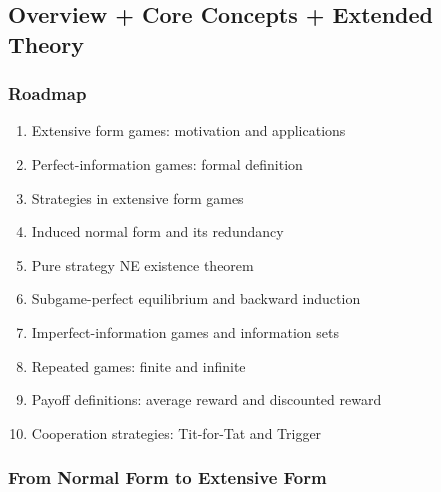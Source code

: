 \separator

\subsection{Overview + Core Concepts + Extended Theory}

\subsubsection*{Roadmap}
\begin{enumerate}
  \item Extensive form games: motivation and applications
  \item Perfect-information games: formal definition
  \item Strategies in extensive form games
  \item Induced normal form and its redundancy
  \item Pure strategy NE existence theorem
  \item Subgame-perfect equilibrium and backward induction
  \item Imperfect-information games and information sets
  \item Repeated games: finite and infinite
  \item Payoff definitions: average reward and discounted reward
  \item Cooperation strategies: Tit-for-Tat and Trigger
\end{enumerate}

\bigseparator

\subsubsection{From Normal Form to Extensive Form}


